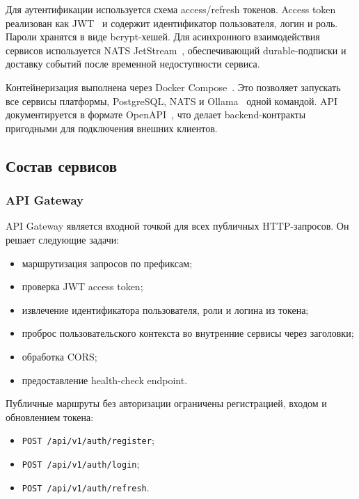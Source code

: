 Для аутентификации используется схема access/refresh токенов. Access token реализован как JWT~\cite{jwt-rfc} и содержит идентификатор пользователя, логин и роль. Пароли хранятся в виде bcrypt-хешей. Для асинхронного взаимодействия сервисов используется NATS JetStream~\cite{nats-docs}, обеспечивающий durable-подписки и доставку событий после временной недоступности сервиса.

Контейнеризация выполнена через Docker Compose~\cite{docker-docs}. Это позволяет запускать все сервисы платформы, PostgreSQL, NATS и Ollama~\cite{ollama-docs} одной командой. API документируется в формате OpenAPI~\cite{openapi-spec}, что делает backend-контракты пригодными для подключения внешних клиентов.

\subsection{Состав сервисов}

\subsubsection{API Gateway}

API Gateway является входной точкой для всех публичных HTTP-запросов. Он решает следующие задачи:

\begin{itemize}
\tightlist
\item
  маршрутизация запросов по префиксам;
\item
  проверка JWT access token;
\item
  извлечение идентификатора пользователя, роли и логина из токена;
\item
  проброс пользовательского контекста во внутренние сервисы через заголовки;
\item
  обработка CORS;
\item
  предоставление health-check endpoint.
\end{itemize}

Публичные маршруты без авторизации ограничены регистрацией, входом и обновлением токена:

\begin{itemize}
\tightlist
\item
  \passthrough{\lstinline!POST /api/v1/auth/register!};
\item
  \passthrough{\lstinline!POST /api/v1/auth/login!};
\item
  \passthrough{\lstinline!POST /api/v1/auth/refresh!}.
\end{itemize}


